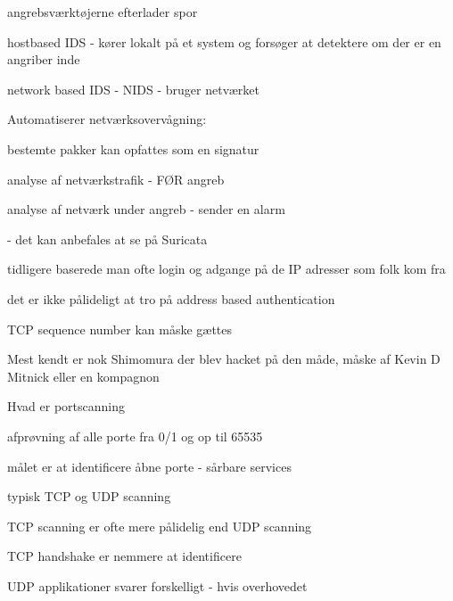 \documentclass[20pt,landscape,a4paper,footrule]{foils}
\begin{document}

\begin{list1}
\item angrebsværktøjerne efterlader spor
\item hostbased IDS - kører lokalt på et system og forsøger at
  detektere om der er en angriber inde
\item network based IDS - NIDS - bruger netværket
\item Automatiserer netværksovervågning:
  \begin{list2}
  \item bestemte pakker kan opfattes som en signatur
\item analyse af netværkstrafik - FØR angreb
\item analyse af netværk under angreb - sender en alarm
  \end{list2}
\item {} - det kan anbefales at se på Suricata
\end{list1}


\begin{list1}
  \item tidligere baserede man ofte login og adgange på de IP adresser
  som folk kom fra
\item det er ikke pålideligt at tro på address based authentication
\item TCP sequence number kan måske gættes
\item Mest kendt er nok Shimomura der blev hacket på den måde, måske
  af Kevin D Mitnick eller en kompagnon
\end{list1}


\begin{list1}
\item Hvad er portscanning
\item afprøvning af alle porte fra 0/1 og op til 65535
\item målet er at identificere åbne porte - sårbare services
\item typisk TCP og UDP scanning
\item TCP scanning er ofte mere pålidelig end UDP scanning
\end{list1}

{\hlkbig TCP handshake er nemmere at identificere

UDP applikationer svarer forskelligt - hvis overhovedet}
\end{document}
